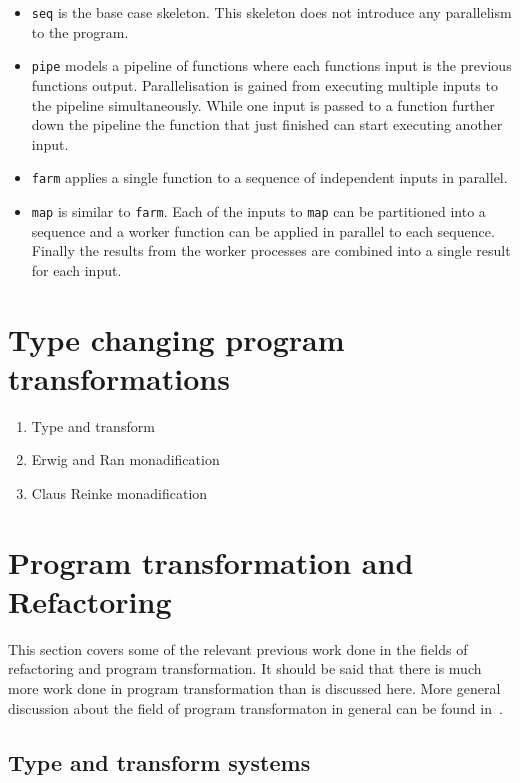 \begin{itemize}
\item \texttt{seq} is the base case skeleton. This skeleton does not introduce any parallelism to the program. 
\item \texttt{pipe} models a pipeline of functions where each functions input is the previous functions output. Parallelisation is gained from executing multiple inputs to the pipeline simultaneously. While one input is passed to a function further down the pipeline the function that just finished can start executing another input.
\item \texttt{farm} applies a single function to a sequence of independent inputs in parallel.
\item \texttt{map} is similar to \texttt{farm}. Each of the inputs to \texttt{map} can be partitioned into a sequence and a worker function can be applied in parallel to each sequence. Finally the results from the worker processes are combined into a single result for each input.   
\end{itemize} 

\section{Type changing program transformations}\label{typeTrans}

\begin{enumerate}
\item Type and transform
\item Erwig and Ran monadification
\item Claus Reinke monadification
\end{enumerate}


\section{Program transformation and Refactoring}\label{progTran}

This section covers some of the relevant previous work done in the fields of refactoring and program transformation. It should be said that there is much more work done in program transformation than is discussed here. More general discussion about the field of program transformaton in general can be found in~\citep{visserSurvey,transformationIntro}.

\subsection{Type and transform systems}

